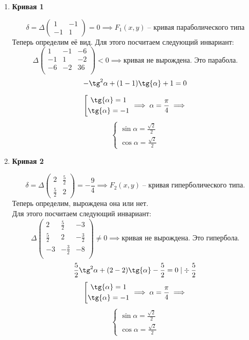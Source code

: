 \documentclass{article}
\theoremstyle{plain}
\begin{document}
\begin{enumerate}
    \item \textbf{Кривая 1}

$$\delta = \Delta \begin{pmatrix} 
1 & -1 \\
-1 & 1
\end{pmatrix} = 0 \implies F_1(x, y)\; \text{--
кривая параболического типа}$$
Теперь определим её вид. Для этого посчитаем следующий инвариант:
$$ \Delta\begin{pmatrix}
    1 & -1 & -6 \\
    -1 & 1 & -2 \\
    -6 & -2 & 36\\
\end{pmatrix}  < 0 \implies \text{кривая не вырождена. Это парабола.}$$
$$-\tg^2{\alpha} + (1 - 1)\tg{\alpha} + 1 = 0
$$

$$
\left[ \begin{gathered}
    \tg{\alpha} = 1 \\
    \tg{\alpha} = -1
\end{gathered} \right.\implies \alpha = \frac{\pi}{4}\implies$$
\begin{equation}
    \begin{cases}
    \sin{\alpha} = \frac{\sqrt{2}}{2} \\
    \cos{\alpha} = \frac{\sqrt{2}}{2}
    \end{cases}
\end{equation}
\item \textbf{Кривая 2}

$$\delta = \Delta \begin{pmatrix} 
2 & \frac{5}{2} \\
\frac{5}{2} & 2
\end{pmatrix} = -\frac{9}{4} \implies F_2(x, y)\; \text{--
кривая гиперболического типа.}$$
Теперь определим, вырождена она или нет.\\
Для этого посчитаем следующий инвариант:
$$\Delta\begin{pmatrix}
    2 & \frac{5}{2} & -3 \\
    \frac{5}{2} & 2 & -\frac{3}{2} \\
    -3 & -\frac{3}{2} & -8\\
\end{pmatrix}  \ne 0 \implies \text{кривая не вырождена. Это гипербола.}$$
$$\frac{5}{2}\tg^2{\alpha} + (2 - 2)\tg{\alpha} - \frac{5}{2} = 0\; | \div \frac{5}{2}
$$
$$
\left[ \begin{gathered}
    \tg{\alpha} = 1 \\
    \tg{\alpha} = -1
\end{gathered} \right.\implies \alpha = \frac{\pi}{4}\implies$$
\begin{equation}
    \begin{cases}
    \sin{\alpha} = \frac{\sqrt{2}}{2} \\
    \cos{\alpha} = \frac{\sqrt{2}}{2}
    \end{cases}
\end{equation}
\end{enumerate}
\newpage
\end{document}
